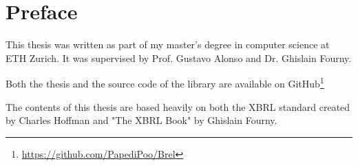 \chapter*{Preface}

This thesis was written as part of my master's degree in computer science at ETH Zurich.
It was supervised by Prof. Gustavo Alonso and Dr. Ghislain Fourny.

Both the thesis and the source code of the library are available on GitHub\footnote{\url{https://github.com/PapediPoo/Brel}}

The contents of this thesis are based heavily on both the XBRL standard\cite{xbrl} created by Charles Hoffman and "The XBRL Book"\cite{fourny2023xbrl} by Ghislain Fourny.